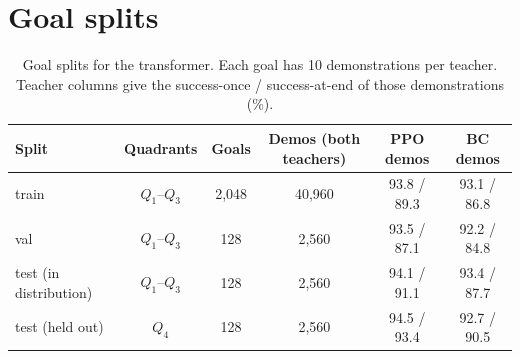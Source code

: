 \section{Goal splits}
\begin{table}[h]
\centering
\caption{Goal splits for the transformer. Each goal has 10 demonstrations per teacher. Teacher columns give the success-once /
success-at-end of those demonstrations (\%).}
\label{tab:splits}
\begin{tabular}{lccccc}
\toprule
Split & Quadrants & Goals & Demos (both teachers) & PPO demos & BC demos \\
\midrule
train & $Q_1$--$Q_3$ & 2{,}048 & 40{,}960 & 93.8 / 89.3 & 93.1 / 86.8 \\
val & $Q_1$--$Q_3$ & 128 & 2{,}560 & 93.5 / 87.1 & 92.2 / 84.8 \\
test (in distribution) & $Q_1$--$Q_3$ & 128 & 2{,}560 & 94.1 / 91.1 & 93.4 / 87.7 \\
test (held out) & $Q_4$ & 128 & 2{,}560 & 94.5 / 93.4 & 92.7 / 90.5 \\
\bottomrule
\end{tabular}
\end{table}

